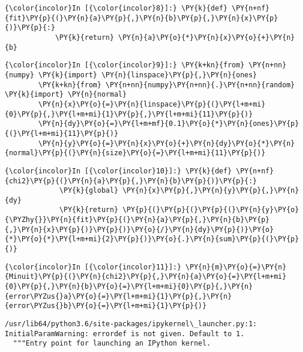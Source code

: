     \begin{Verbatim}[commandchars=\\\{\}]
{\color{incolor}In [{\color{incolor}8}]:} \PY{k}{def} \PY{n+nf}{fit}\PY{p}{(}\PY{n}{a}\PY{p}{,}\PY{n}{b}\PY{p}{,}\PY{n}{x}\PY{p}{)}\PY{p}{:}
            \PY{k}{return} \PY{n}{a}\PY{o}{*}\PY{n}{x}\PY{o}{+}\PY{n}{b}
\end{Verbatim}


    \begin{Verbatim}[commandchars=\\\{\}]
{\color{incolor}In [{\color{incolor}9}]:} \PY{k+kn}{from} \PY{n+nn}{numpy} \PY{k}{import} \PY{n}{linspace}\PY{p}{,}\PY{n}{ones}
        \PY{k+kn}{from} \PY{n+nn}{numpy}\PY{n+nn}{.}\PY{n+nn}{random} \PY{k}{import} \PY{n}{normal}
        \PY{n}{x}\PY{o}{=}\PY{n}{linspace}\PY{p}{(}\PY{l+m+mi}{0}\PY{p}{,}\PY{l+m+mi}{1}\PY{p}{,}\PY{l+m+mi}{11}\PY{p}{)}
        \PY{n}{dy}\PY{o}{=}\PY{l+m+mf}{0.1}\PY{o}{*}\PY{n}{ones}\PY{p}{(}\PY{l+m+mi}{11}\PY{p}{)}
        \PY{n}{y}\PY{o}{=}\PY{n}{x}\PY{o}{+}\PY{n}{dy}\PY{o}{*}\PY{n}{normal}\PY{p}{(}\PY{n}{size}\PY{o}{=}\PY{l+m+mi}{11}\PY{p}{)}
\end{Verbatim}


    \begin{Verbatim}[commandchars=\\\{\}]
{\color{incolor}In [{\color{incolor}10}]:} \PY{k}{def} \PY{n+nf}{chi2}\PY{p}{(}\PY{n}{a}\PY{p}{,}\PY{n}{b}\PY{p}{)}\PY{p}{:}
             \PY{k}{global} \PY{n}{x}\PY{p}{,}\PY{n}{y}\PY{p}{,}\PY{n}{dy}
             \PY{k}{return} \PY{p}{(}\PY{p}{(}\PY{p}{(}\PY{n}{y}\PY{o}{\PYZhy{}}\PY{n}{fit}\PY{p}{(}\PY{n}{a}\PY{p}{,}\PY{n}{b}\PY{p}{,}\PY{n}{x}\PY{p}{)}\PY{p}{)}\PY{o}{/}\PY{n}{dy}\PY{p}{)}\PY{o}{*}\PY{o}{*}\PY{l+m+mi}{2}\PY{p}{)}\PY{o}{.}\PY{n}{sum}\PY{p}{(}\PY{p}{)}
\end{Verbatim}


    \begin{Verbatim}[commandchars=\\\{\}]
{\color{incolor}In [{\color{incolor}11}]:} \PY{n}{m}\PY{o}{=}\PY{n}{Minuit}\PY{p}{(}\PY{n}{chi2}\PY{p}{,}\PY{n}{a}\PY{o}{=}\PY{l+m+mi}{0}\PY{p}{,}\PY{n}{b}\PY{o}{=}\PY{l+m+mi}{0}\PY{p}{,}\PY{n}{error\PYZus{}a}\PY{o}{=}\PY{l+m+mi}{1}\PY{p}{,}\PY{n}{error\PYZus{}b}\PY{o}{=}\PY{l+m+mi}{1}\PY{p}{)}
\end{Verbatim}


    \begin{Verbatim}[commandchars=\\\{\}]
/usr/lib64/python3.6/site-packages/ipykernel\_launcher.py:1: InitialParamWarning: errordef is not given. Default to 1.
  """Entry point for launching an IPython kernel.

    \end{Verbatim}

